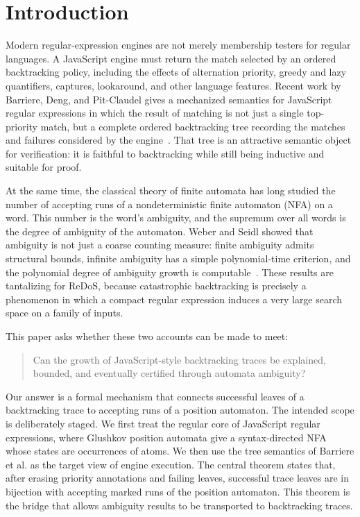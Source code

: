 \section{Introduction}

Modern regular-expression engines are not merely membership testers for regular
languages.  A JavaScript engine must return the match selected by an ordered
backtracking policy, including the effects of alternation priority, greedy and
lazy quantifiers, captures, lookaround, and other language features.  Recent
work by Barriere, Deng, and Pit-Claudel gives a mechanized semantics for
JavaScript regular expressions in which the result of matching is not just a
single top-priority match, but a complete ordered backtracking tree recording the
matches and failures considered by the engine~\cite{barriere2026jsregex}.  That
tree is an attractive semantic object for verification: it is faithful to
backtracking while still being inductive and suitable for proof.

At the same time, the classical theory of finite automata has long studied the
number of accepting runs of a nondeterministic finite automaton (NFA) on a word.
This number is the word's ambiguity, and the supremum over all words is the
degree of ambiguity of the automaton.  Weber and Seidl showed that ambiguity is
not just a coarse counting measure: finite ambiguity admits structural bounds,
infinite ambiguity has a simple polynomial-time criterion, and the polynomial
degree of ambiguity growth is computable~\cite{weber1991ambiguity}.  These
results are tantalizing for ReDoS, because catastrophic backtracking is precisely
a phenomenon in which a compact regular expression induces a very large search
space on a family of inputs.

This paper asks whether these two accounts can be made to meet:
\begin{quote}
Can the growth of JavaScript-style backtracking traces be explained, bounded, and
eventually certified through automata ambiguity?
\end{quote}

Our answer is a formal mechanism that connects successful leaves of a
backtracking trace to accepting runs of a position automaton.  The intended
scope is deliberately staged.  We first treat the regular core of JavaScript
regular expressions, where Glushkov position automata give a syntax-directed NFA
whose states are occurrences of atoms.  We then use the tree semantics of
Barriere et al. as the target view of engine execution.  The central theorem
states that, after erasing priority annotations and failing leaves, successful
trace leaves are in bijection with accepting marked runs of the position
automaton.  This theorem is the bridge that allows ambiguity results to be
transported to backtracking traces.

